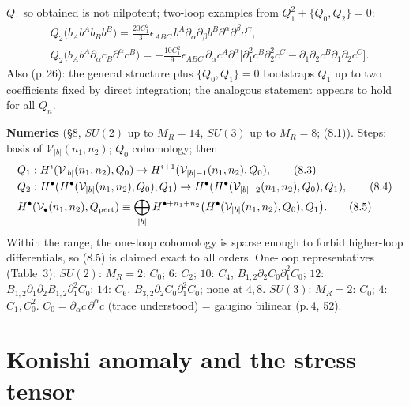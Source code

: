 \documentclass[11pt]{article}
\begin{document}
$Q_1$ so obtained is not nilpotent; two-loop examples from $Q_1^2+\{Q_0,Q_2\}=0$:
\begin{align}
&Q_2\big(b_Ab^Ab_Bb^B\big)=\frac{20C_1^2}{3}\epsilon_{ABC}\,b^A\partial_\alpha\partial_\beta b^B\partial^\alpha\partial^\beta c^C, \tag{C.8}\\
&Q_2\big(b_Ab^A\partial_\alpha c_B\partial^\alpha c^B\big)=-\frac{10C_1^2}{9}\epsilon_{ABC}\,\partial_\alpha c^A\partial^\alpha\Big[\partial_1^2c^B\partial_2^2c^C-\partial_1\partial_2c^B\partial_1\partial_2c^C\Big]. \tag{C.9}
\end{align}
Also (p.\,26): the general structure plus $\{Q_0,Q_1\}=0$ bootstraps $Q_1$ up to two coefficients fixed by direct integration; the analogous statement appears to hold for all $Q_n$.

\textbf{Numerics} (§8, $SU(2)$ up to $M_R=14$, $SU(3)$ up to $M_R=8$; (8.1)). Steps: basis of $\mathcal V_{|b|}(n_1,n_2)$; $Q_0$ cohomology; then
\begin{align}
&Q_1:H^i(\mathcal V_{|b|}(n_1,n_2),Q_0)\to H^{i+1}(\mathcal V_{|b|-1}(n_1,n_2),Q_0), \tag{8.3}\\
&Q_2:H^\bullet(H^\bullet(\mathcal V_{|b|}(n_1,n_2),Q_0),Q_1)\to H^\bullet(H^\bullet(\mathcal V_{|b|-2}(n_1,n_2),Q_0),Q_1), \tag{8.4}\\
&H^\bullet(\mathcal V_\bullet(n_1,n_2),Q_{\rm pert})\equiv\bigoplus_{|b|}H^{\bullet+n_1+n_2}\big(H^\bullet(\mathcal V_{|b|}(n_1,n_2),Q_0),Q_1\big). \tag{8.5}
\end{align}
Within the range, the one-loop cohomology is sparse enough to forbid higher-loop differentials, so (8.5) is claimed exact to all orders. One-loop representatives (Table~3): $SU(2)$: $M_R=2$: $C_0$; $6$: $C_2$; $10$: $C_4$, $B_{1,2}\partial_2C_0\partial_1^2C_0$; $12$: $B_{1,2}\partial_1\partial_2B_{1,2}\partial_1^2C_0$; $14$: $C_6$, $B_{3,2}\partial_2C_0\partial_1^2C_0$; none at $4,8$. $SU(3)$: $M_R=2$: $C_0$; $4$: $C_1,C_0^2$. $C_0=\partial_\alpha c\,\partial^\alpha c$ (trace understood) = gaugino bilinear (p.\,4, 52).

\section{Konishi anomaly and the stress tensor}
\end{document}
